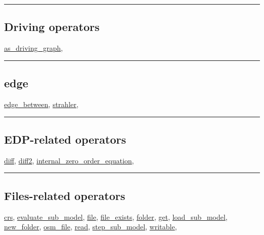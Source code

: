\documentclass[]{book}
\theoremstyle{definition}
\theoremstyle{definition}
\theoremstyle{definition}
\theoremstyle{remark}
\begin{document}
\begin{center}\rule{0.5\linewidth}{\linethickness}\end{center}

\subsection{Driving operators}\label{driving-operators}

\href{operators-a-to-a.html\#as_driving_graph}{as\_driving\_graph},

\begin{center}\rule{0.5\linewidth}{\linethickness}\end{center}

\subsection{edge}\label{edge}

\href{operators-d-to-h.html\#edge_between}{edge\_between},
\href{operators-s-to-z.html\#strahler}{strahler},

\begin{center}\rule{0.5\linewidth}{\linethickness}\end{center}

\subsection{EDP-related operators}\label{edp-related-operators}

\href{operators-d-to-h.html\#diff}{diff},
\href{operators-d-to-h.html\#diff2}{diff2},
\href{operators-i-to-m.html\#internal_zero_order_equation}{internal\_zero\_order\_equation},

\begin{center}\rule{0.5\linewidth}{\linethickness}\end{center}

\subsection{Files-related operators}\label{files-related-operators}

\href{operators-b-to-c.html\#crs}{crs},
\href{operators-d-to-h.html\#evaluate_sub_model}{evaluate\_sub\_model},
\href{operators-d-to-h.html\#file}{file},
\href{operators-d-to-h.html\#file_exists}{file\_exists},
\href{operators-d-to-h.html\#folder}{folder},
\href{operators-d-to-h.html\#get}{get},
\href{operators-i-to-m.html\#load_sub_model}{load\_sub\_model},
\href{operators-n-to-r.html\#new_folder}{new\_folder},
\href{operators-n-to-r.html\#osm_file}{osm\_file},
\href{operators-n-to-r.html\#read}{read},
\href{operators-s-to-z.html\#step_sub_model}{step\_sub\_model},
\href{operators-s-to-z.html\#writable}{writable},
\end{document}
